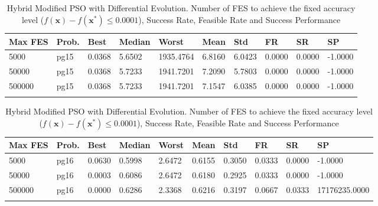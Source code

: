\documentclass[10pt, a4paper]{book}
\begin{document}
\begin{center}
\begin{longtable}{l l l l l l l l l l}
\textbf{Max FES} & \textbf{Prob.} & \textbf{Best} & \textbf{Median} & \textbf{Worst} & \textbf{Mean} & \textbf{Std} & \textbf{FR} & \textbf{SR} & \textbf{SP} \\
\hline
5000 & pg15 & 0.0368 & 5.6502 & 1935.4764 & 6.8160 & 6.0423 & 0.0000 & 0.0000 & -1.0000 \\
50000 & pg15 & 0.0368 & 5.7233 & 1941.7201 & 7.2090 & 5.7803 & 0.0000 & 0.0000 & -1.0000 \\
500000 & pg15 & 0.0368 & 5.7233 & 1941.7201 & 7.1547 & 6.0385 & 0.0000 & 0.0000 & -1.0000 \\

\caption{ Hybrid Modified PSO with Differential Evolution. Number of FES to achieve the fixed accuracy level ($f(\mathbf{x}) - f(\mathbf{x}^{*}) \leq 0.0001$), Success Rate, Feasible Rate and Success Performance }
\end{longtable}
\end{center}

\begin{center}
\begin{longtable}{l l l l l l l l l l}
\textbf{Max FES} & \textbf{Prob.} & \textbf{Best} & \textbf{Median} & \textbf{Worst} & \textbf{Mean} & \textbf{Std} & \textbf{FR} & \textbf{SR} & \textbf{SP} \\
\hline
5000 & pg16 & 0.0630 & 0.5998 & 2.6472 & 0.6155 & 0.3050 & 0.0333 & 0.0000 & -1.0000 \\
50000 & pg16 & 0.0003 & 0.6086 & 2.6472 & 0.6180 & 0.2925 & 0.0333 & 0.0000 & -1.0000 \\
500000 & pg16 & 0.0000 & 0.6286 & 2.3368 & 0.6216 & 0.3197 & 0.0667 & 0.0333 & 17176235.0000 \\

\caption{ Hybrid Modified PSO with Differential Evolution. Number of FES to achieve the fixed accuracy level ($f(\mathbf{x}) - f(\mathbf{x}^{*}) \leq 0.0001$), Success Rate, Feasible Rate and Success Performance }
\end{longtable}
\end{center}
\end{document}
